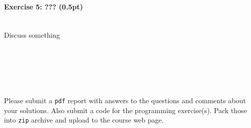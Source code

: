 \documentclass[a4paper,11pt]{article}
\newenvironment{exercise}[3]{\paragraph{Exercise #1: #2 (#3pt)}\ \\}{
\medskip}
\begin{document}
\begin{exercise}{5}{???}{0.5}
Discuss something
\end{exercise}



\ \\
\ \\
\ \\
\ \\
\ \\
Please submit a \texttt{pdf} report with answers to the questions and comments about your solutions. Also submit a code for the programming exercise(s). Pack those into \texttt{zip} archive and upload to the course web page.
\end{document}
